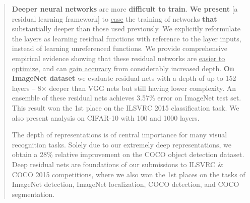 \begin{abstract}
\textbf{Deeper neural networks} are more \textbf{difficult to train}. \textbf{We present} [a residual learning framework] to \underline{ease} the training of networks \textbf{that} substantially deeper than those used previously. We explicitly reformulate the layers as learning residual functions with reference to the layer inputs, instead of learning unreferenced functions. We provide comprehensive empirical evidence showing that these residual networks are \underline{easier to optimize}, and can \underline{gain accuracy} from considerably increased depth. \textbf{On ImageNet dataset} we evaluate residual nets with a depth of up to 152 layers -- 8$\times$ deeper than VGG nets but still having lower complexity. An ensemble of these residual nets achieves 3.57\% error on ImageNet test set. This result won the 1st place on the ILSVRC 2015 classification task. We also present analysis on CIFAR-10 with 100 and 1000 layers.


The depth of representations is of central importance for many visual recognition tasks. Solely due to our extremely deep representations, we obtain a 28\% relative improvement on the COCO object detection dataset. Deep residual nets are foundations of our submissions to ILSVRC \& COCO 2015 competitions, where we also won the 1st places on the tasks of ImageNet detection, ImageNet localization, COCO detection, and COCO segmentation.
\end{abstract}